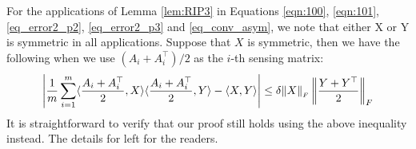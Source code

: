 For the applications of Lemma \ref{lem:RIP3} in Equations \eqref{eqn:100}, \eqref{eqn:101}, \eqref{eq_error2_p2}, \eqref{eq_error2_p3} and \eqref{eq_conv_asym},
we note that either X or Y is symmetric in all applications.
Suppose that $X$ is symmetric, then we have the following
when we use $(A_i + A_i^{\top}) / 2$ as the $i$-th sensing matrix:
\begin{align*}
	\left|{\frac 1 m \sum_{i=1}^m \langle\frac{A_i + A_i^{\top} } 2, X\rangle \langle\frac{A_i + A_i^{\top}} 2, Y\rangle - \langle X, Y\rangle}\right|
	\le \delta \|X\|_{_{F}} \left\|\frac{Y + Y^{\top}} 2\right\|_{F}
\end{align*}
It is straightforward to verify that our proof still holds using the above inequality instead. The details for left for the readers.
